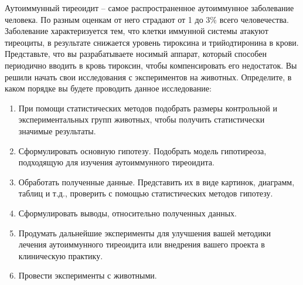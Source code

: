 
Аутоиммунный тиреоидит – самое распространенное аутоиммунное
заболевание человека. По разным оценкам от него страдают от 1 до $3\%$ всего
человечества. Заболевание характеризуется тем, что клетки иммунной системы
атакуют тиреоциты, в результате снижается уровень тироксина и трийодтиронина в
крови. Представьте, что вы разрабатываете носимый аппарат, который способен
периодично вводить в кровь тироксин, чтобы компенсировать его недостаток. Вы
решили начать свои исследования с экспериментов на животных. Определите, в
каком порядке вы будете проводить данное исследование:

\begin{enumerate}
    \item При помощи статистических методов подобрать размеры контрольной и экспериментальных групп животных, чтобы получить статистически значимые результаты.
    \item Сформулировать основную гипотезу. Подобрать модель гипотиреоза, подходящую для изучения аутоиммунного тиреоидита.
    \item Обработать полученные данные. Представить их в виде картинок, диаграмм, таблиц и т.д., проверить с помощью статистических методов гипотезу.
    \item Сформулировать выводы, относительно полученных данных.
    \item Продумать дальнейшие эксперименты для улучшения вашей методики лечения аутоиммунного тиреоидита или внедрения вашего проекта в клиническую практику.
    \item Провести эксперименты с животными.
\end{enumerate}



